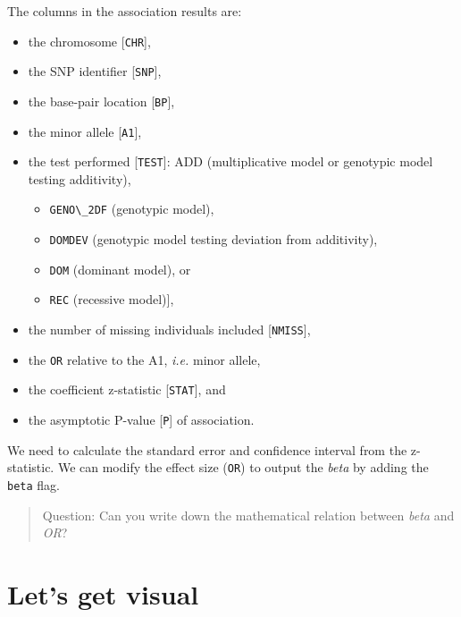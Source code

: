 \documentclass[
]{book}
\newcommand{\passthrough}[1]{#1}
\providecommand{\tightlist}{%
  \setlength{\itemsep}{0pt}\setlength{\parskip}{0pt}}
\begin{document}
The columns in the association results are:

\begin{itemize}
\tightlist
\item
  the chromosome {[}\passthrough{\lstinline!CHR!}{]},
\item
  the SNP identifier {[}\passthrough{\lstinline!SNP!}{]},
\item
  the base-pair location {[}\passthrough{\lstinline!BP!}{]},
\item
  the minor allele {[}\passthrough{\lstinline!A1!}{]},
\item
  the test performed {[}\passthrough{\lstinline!TEST!}{]}: ADD (multiplicative model or genotypic model testing additivity),

  \begin{itemize}
  \tightlist
  \item
    \passthrough{\lstinline!GENO\_2DF!} (genotypic model),
  \item
    \passthrough{\lstinline!DOMDEV!} (genotypic model testing deviation from additivity),
  \item
    \passthrough{\lstinline!DOM!} (dominant model), or
  \item
    \passthrough{\lstinline!REC!} (recessive model){]},
  \end{itemize}
\item
  the number of missing individuals included {[}\passthrough{\lstinline!NMISS!}{]},
\item
  the \passthrough{\lstinline!OR!} relative to the A1, \emph{i.e.} minor allele,
\item
  the coefficient z-statistic {[}\passthrough{\lstinline!STAT!}{]}, and
\item
  the asymptotic P-value {[}\passthrough{\lstinline!P!}{]} of association.
\end{itemize}

We need to calculate the standard error and confidence interval from the z-statistic. We can modify the effect size (\passthrough{\lstinline!OR!}) to output the \emph{beta} by adding the \passthrough{\lstinline!beta!} flag.

\begin{quote}
Question: Can you write down the mathematical relation between \emph{beta} and \emph{OR}?
\end{quote}

\hypertarget{lets-get-visual}{%
\section{Let's get visual}\label{lets-get-visual}}
\end{document}
